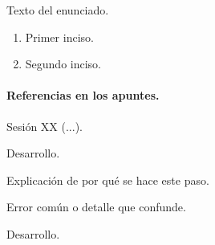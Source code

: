 
\begin{enunciado}
Texto del enunciado.
\begin{enumerate}[label=(\alph*)]
  \item Primer inciso.
  \item Segundo inciso.
\end{enumerate}
\end{enunciado}

\paragraph{Referencias en los apuntes.} Sesión XX (...).


Desarrollo.

\begin{porque}
Explicación de por qué se hace este paso.
\end{porque}


\begin{ojo}
Error común o detalle que confunde.
\end{ojo}

Desarrollo.

